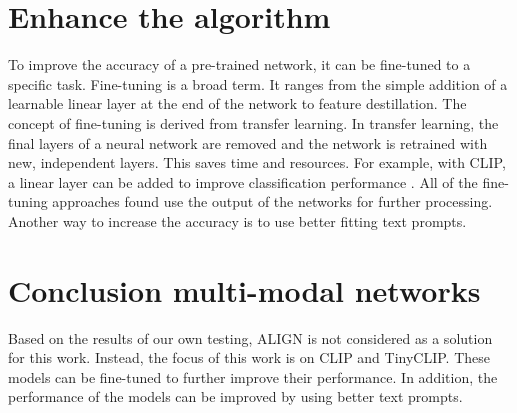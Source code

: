 
\section{Enhance the algorithm}

    To improve the accuracy of a pre-trained network, it can be fine-tuned to a specific task.
    Fine-tuning is a broad term.
    It ranges from the simple addition of a learnable linear layer at the end of the network to feature destillation.
    The concept of fine-tuning is derived from transfer learning\cite{transferlearning}.
    In transfer learning, the final layers of a neural network are removed and the network is retrained with new, independent layers.
    This saves time and resources.
    For example, with CLIP, a linear layer can be added to improve classification performance \cite{finetuneclip}.
    All of the fine-tuning approaches found use the output of the networks for further processing.
    Another way to increase the accuracy is to use better fitting text prompts.


\section{Conclusion multi-modal networks}
    Based on the results of our own testing, ALIGN is not considered as a solution for this work.
    Instead, the focus of this work is on CLIP and TinyCLIP.
    These models can be fine-tuned to further improve their performance.
    In addition, the performance of the models can be improved by using better text prompts.
